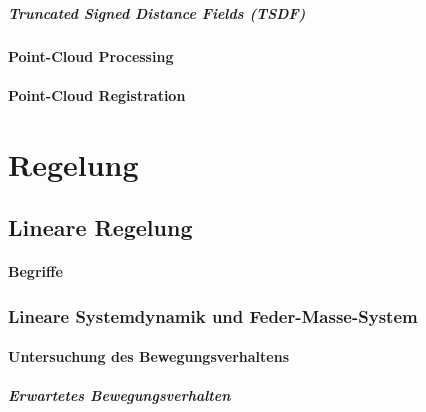 \documentclass[a4paper, 11pt, accentcolor = tud3b]{tudreport}
\begin{document}
					\paragraph{Truncated Signed Distance Fields (TSDF)} %

				\subsubsection{Point-Cloud Processing} %

				\subsubsection{Point-Cloud Registration} %

	\chapter{Regelung} %

		\section{Lineare Regelung} %

				\subsubsection{Begriffe} %

			\subsection{Lineare Systemdynamik und Feder-Masse-System} %

				\subsubsection{Untersuchung des Bewegungsverhaltens} %

					\paragraph{Erwartetes Bewegungsverhalten} %
\end{document}
